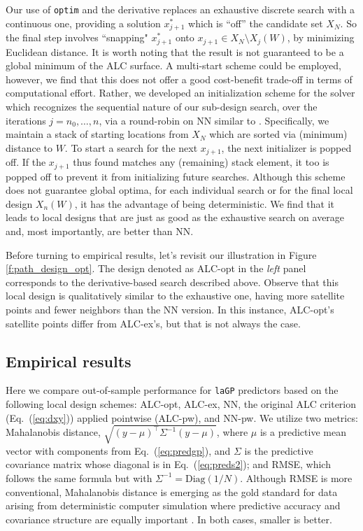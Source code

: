 \documentclass[12pt]{article}
\begin{document}
Our use of {\tt optim} and the derivative replaces an exhaustive discrete
search with a continuous one, providing a solution $x^{\ast}_{j+1}$ which is
``off'' the candidate set $X_N$.  So the final step involves ``snapping"
$x^{\ast}_{j+1}$ onto $x_{j+1} \in X_N \setminus X_j(W)$, by minimizing
Euclidean distance. It is worth noting that the result is not guaranteed to be
a global minimum of the ALC surface.  A multi-start scheme could be employed,
however, we find that this does not offer a good cost-benefit trade-off in
terms of computational effort.  Rather, we developed an initialization scheme
for the solver which recognizes the sequential nature of our sub-design
search, over the iterations $j=n_0, \dots, n$, via a round-robin on NN similar
to \citet{gramacy:haaland:2015}. Specifically, we maintain a stack of starting
locations from $X_N$ which are sorted via (minimum) distance to $W$.  To start
a search for the next $x_{j+1}$, the next initializer is popped off.
If the $x_{j+1}$ thus found matches any (remaining) stack element, it too is popped off to
prevent it from initializing future searches.  Although
this scheme does not guarantee global optima, for each individual search
or for the final local design $X_n(W)$, it has the advantage of being
deterministic. We find that it leads to local designs that are just as good as
the exhaustive search on average and, most importantly, are better than
NN.

Before turning to empirical results, let's revisit our illustration in
Figure \ref{f:path_design_opt}. The design denoted as ALC-opt in the {\em
left} panel corresponds to the derivative-based search described above.
Observe that this local design is qualitatively similar to the exhaustive one,
having more satellite points and fewer neighbors than the NN version.  In this
instance, ALC-opt's satellite points differ from ALC-ex's, but that is not always the case.

\subsection{Empirical results}
\label{sec:er}

Here we compare out-of-sample performance for {\tt laGP} predictors based on
the following local design schemes: ALC-opt, ALC-ex, NN, the original ALC
criterion (Eq.~(\ref{eq:dxy})) applied pointwise (ALC-pw), and NN-pw. We utilize two
metrics: Mahalanobis distance, $\sqrt{(y - \mu)^\top \Sigma^{-1} (y -
\mu)}$, where $\mu$ is a predictive mean vector with components from
Eq.~(\ref{eq:predgp}), and $\Sigma$ is the predictive covariance matrix whose
diagonal is in Eq.~(\ref{eq:preds2}); and RMSE, which follows the same formula but
with $\Sigma^{-1} =
\mathrm{Diag}(1/N)$.  Although RMSE is more conventional, Mahalanobis distance
is emerging as the gold standard for data arising from deterministic
computer simulation where predictive accuracy and covariance structure are
equally important \citep{bastos:ohagan:2009}.  In both cases, smaller is better.
\end{document}
